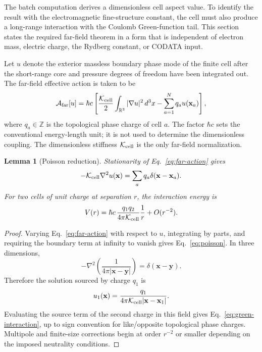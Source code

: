 \documentclass[11pt]{article}
\newcommand{\Kcell}{\mathcal K_{\rm cell}}
\newcommand{\Afar}{\mathcal A_{\rm far}}
\newtheorem{lemma}{Lemma}
\begin{document}
\label{sec:farfield}

The batch computation derives a dimensionless cell aspect value. To identify the result with the electromagnetic fine-structure constant, the cell must also produce a long-range interaction with the Coulomb Green-function tail. This section states the required far-field theorem in a form that is independent of electron mass, electric charge, the Rydberg constant, or CODATA input.

Let \(u\) denote the exterior massless boundary phase mode of the finite cell after the short-range core and pressure degrees of freedom have been integrated out. The far-field effective action is taken to be
\begin{equation}
\Afar[u]
=
\hbar c\left[
\frac{\Kcell}{2}
\int_{\mathbb R^3} |\nabla u|^2\,d^3x
-
\sum_{a=1}^{N} q_a u(\mathbf x_a)
\right],
\label{eq:far-action}
\end{equation}
where \(q_a\in\mathbb Z\) is the topological phase charge of cell \(a\). The factor \(\hbar c\) sets the conventional energy-length unit; it is not used to determine the dimensionless coupling. The dimensionless stiffness \(\Kcell\) is the only far-field normalization.

\begin{lemma}[Poisson reduction]
Stationarity of Eq.~\eqref{eq:far-action} gives
\begin{equation}
-\Kcell \nabla^2 u(\mathbf x)=\sum_a q_a\delta(\mathbf x-\mathbf x_a).
\label{eq:poisson}
\end{equation}
For two cells of unit charge at separation \(r\), the interaction energy is
\begin{equation}
V(r)=\hbar c\,\frac{q_1q_2}{4\pi\Kcell}\frac{1}{r}+O(r^{-2}).
\label{eq:green-interaction}
\end{equation}
\end{lemma}

\begin{proof}
Varying Eq.~\eqref{eq:far-action} with respect to \(u\), integrating by parts, and requiring the boundary term at infinity to vanish gives Eq.~\eqref{eq:poisson}. In three dimensions,
\begin{equation}
-\nabla^2\left(\frac{1}{4\pi |\mathbf x-\mathbf y|}\right)=\delta(\mathbf x-\mathbf y).
\end{equation}
Therefore the solution sourced by charge \(q_1\) is
\begin{equation}
u_1(\mathbf x)=\frac{q_1}{4\pi\Kcell |\mathbf x-\mathbf x_1|}.
\end{equation}
Evaluating the source term of the second charge in this field gives Eq.~\eqref{eq:green-interaction}, up to sign convention for like/opposite topological phase charges. Multipole and finite-size corrections begin at order \(r^{-2}\) or smaller depending on the imposed neutrality conditions.
\end{proof}
\end{document}
